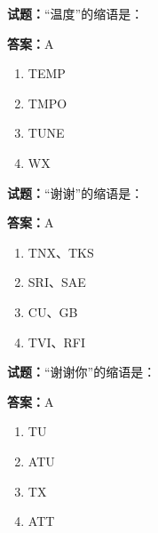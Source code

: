 \documentclass{ctexbook}
\begin{document}




\vspace{1em}

\textbf{试题：}“温度”的缩语是： 

\textbf{答案：}A 

\begin{enumerate}[leftmargin=3em]
  \item TEMP 

  \item TMPO 

  \item TUNE 

  \item WX 

\end{enumerate}





\vspace{1em}

\textbf{试题：}“谢谢”的缩语是： 

\textbf{答案：}A 

\begin{enumerate}[leftmargin=3em]
  \item TNX、TKS 

  \item SRI、SAE 

  \item CU、GB 

  \item TVI、RFI 

\end{enumerate}





\vspace{1em}

\textbf{试题：}“谢谢你”的缩语是： 


\textbf{答案：}A 

\begin{enumerate}[leftmargin=3em]
  \item TU 

  \item ATU 

  \item TX 

  \item ATT 

\end{enumerate}
\end{document}
